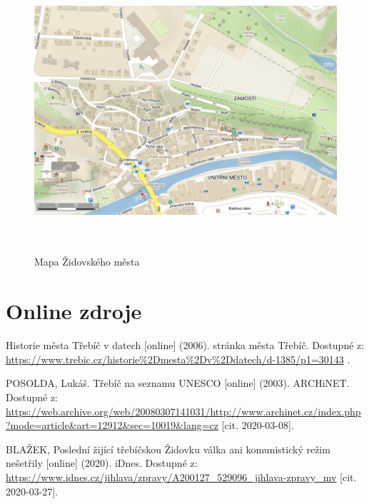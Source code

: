 \documentclass[a4paper,oneside,12pt]{report}
\let\openright=\clearpage
\begin{document}
\begin{figure}
	\centering
	\includegraphics[height=10.5cm]{../img/mapaZidovskehoMesta.png}
	\caption[Mapa Židovského města \text{[online]} Mapy.cz. Dostupné z: \url{https://en.mapy.cz/zakladni?x=15.8789945&y=49.2182114&z=17&source=muni&id=5517} ]{
		Mapa Židovského města
	}
	\label{fig:zhh}
\end{figure}

\chapter*{}

\setcounter{page}{7}





\chapter*{Online zdroje}
\noindent
Historie města Třebíč v datech [online] (2006). stránka města Třebíč. Dostupné z: \url{https://www.trebic.cz/historie\%2Dmesta\%2Dv\%2Ddatech/d-1385/p1=30143} \linebreak[4] [cit. 2020-03-08].

\vspace{0.5cm}
\noindent
POSOLDA, Lukáš. Třebíč na seznamu UNESCO [online] (2003). ARCHiNET. Dostupné z: \url{https://web.archive.org/web/20080307141031/http://www.archinet.cz/index.php?mode=article&art=12912&sec=10019&lang=cz}  [cit. 2020-03-08].

\vspace{0.5cm}
\noindent
BLAŽEK, Poslední žijící třebíčskou Židovku válka ani komunistický režim nešetřily [online] (2020). iDnes. Dostupné z: \url{https://www.idnes.cz/jihlava/zpravy/A200127_529096_jihlava-zpravy_mv} [cit. 2020-03-27].
\listoffigures
\openright
\end{document}
